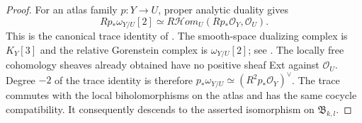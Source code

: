 \begin{proof}
For an atlas family $p:Y\to U$, proper analytic duality gives
\[
 Rp_*\omega_{Y/U}[2]
 \simeq R\mathcal Hom_U(Rp_*\mathcal O_Y,\mathcal O_U).
\]
This is the canonical trace identity of
\cite[introduction, equation (1), p.~261; Section 1, pp.~264--265;
Proposition 2.1, p.~266]{RRV71}.
The smooth-space dualizing complex is $K_Y[3]$ and the relative
Gorenstein complex is $\omega_{Y/U}[2]$; see
\cite[Section 3, Theorem 1, p.~81; Proposition 2 and the
complete-intersection calculation, p.~91]{RR70}.
The locally free cohomology sheaves already obtained have no
positive sheaf Ext against $\mathcal O_U$. Degree $-2$ of the
trace identity is therefore
$p_*\omega_{Y/U}\simeq(R^2p_*\mathcal O_Y)^\vee$.
The trace commutes with the local biholomorphisms on the atlas
and has the same cocycle compatibility. It consequently descends
to the asserted isomorphism on $\mathfrak B_{k,l}$.
\end{proof}

